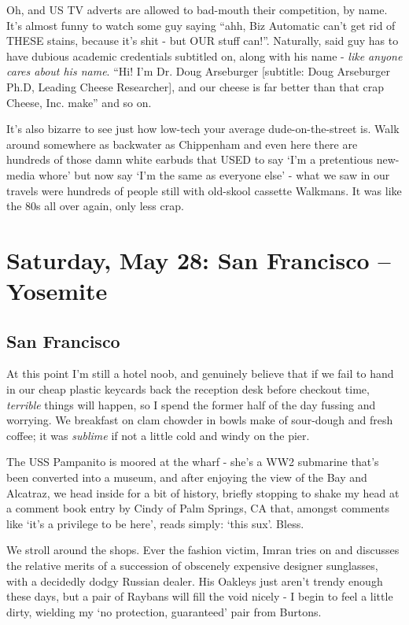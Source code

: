 \documentclass[a5paper,10pt,titlepage,draft]{book}
\begin{document}
Oh, and US TV adverts are allowed to bad-mouth their competition, by name.  It's almost funny to watch some guy saying ``ahh, Biz Automatic can't get rid of THESE stains, because it's shit - but OUR stuff can!''.  Naturally, said guy has to have dubious academic credentials subtitled on, along with his name - \emph{like anyone cares about his name}. ``Hi! I'm Dr. Doug Arseburger [subtitle: Doug Arseburger Ph.D, Leading Cheese Researcher], and our cheese is far better than that crap Cheese, Inc. make'' and so on.

It's also bizarre to see just how low-tech your average dude-on-the-street is.  Walk around somewhere as backwater as Chippenham and even here there are hundreds of those damn white earbuds that USED to say `I'm a pretentious new-media whore' but now say `I'm the same as everyone else' - what we saw in our travels were hundreds of people still with old-skool cassette Walkmans.  It was like the 80s all over again, only less crap.

\chapter[San Francisco -- Yosemite]{Saturday, May 28: San Francisco -- Yosemite}
\section*{San Francisco}
At this point I'm still a hotel noob, and genuinely believe that if we fail to hand in our cheap plastic keycards back the reception desk before checkout time, \emph{terrible} things will happen, so I spend the former half of the day fussing and worrying.  We breakfast on clam chowder in bowls make of sour-dough and fresh coffee; it was \emph{sublime} if not a little cold and windy on the pier.

The USS Pampanito is moored at the wharf - she's a WW2 submarine that's been converted into a museum, and after enjoying the view of the Bay and Alcatraz, we head inside for a bit of history, briefly stopping to shake my head at a comment book entry by Cindy of Palm Springs, CA that, amongst comments like `it's a privilege to be here', reads simply: `this sux'.  Bless.

We stroll around the shops.  Ever the fashion victim, Imran tries on and discusses the relative merits of a succession of obscenely expensive designer sunglasses, with a decidedly dodgy Russian dealer.  His Oakleys just aren't trendy enough these days, but a pair of Raybans will fill the void nicely - I begin to feel a little dirty, wielding my  `no protection, guaranteed' pair from Burtons.
\end{document}
